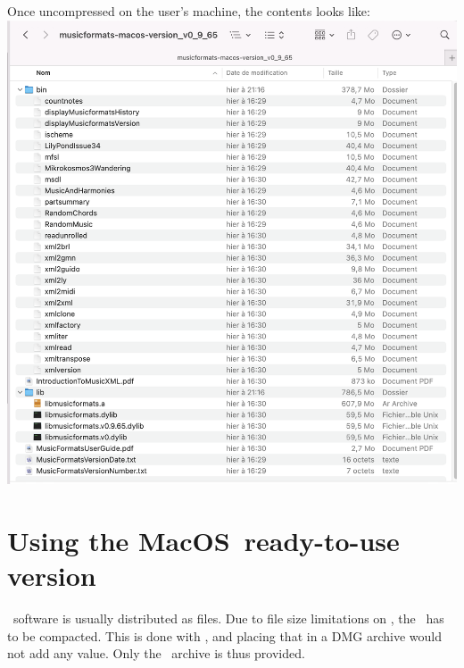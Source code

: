 Once uncompressed on the user's machine, the contents looks like:\\
\includegraphics[scale=0.5]{../graphics/ReadyToUseVersionContentsExample.png}


\section{Using the MacOS\texttrademark\ ready-to-use version}

\MacOS\ software is usually distributed as  files. Due to file size limitations on \github, the \MacOS\ \readyToUseVersion has to be compacted. This is done with \zip, and placing that in a DMG archive would not add any value. Only the \zip\ archive is thus provided.


